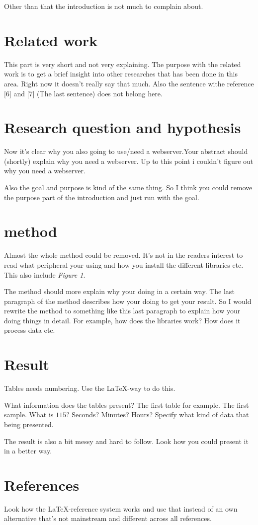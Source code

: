 \documentclass[12pt]{article}
\begin{document}
\bigskip

Other than that the introduction is not much to complain about.

\section{Related work} \label{}
This part is very short and not very explaining. The purpose with the related work is to get a brief insight into other researches that has been done in this area. Right now it doesn't really say that much. Also the sentence withe reference [6] and [7] (The last sentence) does not belong here.

\section{Research question and hypothesis} \label{}
Now it's clear why you also going to use/need a webserver.Your abstract should (shortly) explain why you need a webserver. Up to this point i couldn't figure out why you need a webserver.

Also the goal and purpose is kind of the same thing. So I think you could remove the purpose part of the introduction and just run with the goal.

\section{method} \label{}
Almost the whole method could be removed. It's not in the readers interest to read what peripheral your using and how you install the different libraries etc. This also include \textit{Figure 1}.

\bigskip

The method should more explain why your doing in a certain way. The last paragraph of the method describes how your doing to get your result. So I would rewrite the method to something like this last paragraph to explain how your doing things in detail. For example, how does the libraries work? How does it process data etc.

\section{Result} \label{}
Tables needs numbering. Use the \LaTeX-way to do this.

\bigskip

What information does the tables present? The first table for example. The first sample. What is $115$? Seconds? Minutes? Hours? Specify what kind of data that being presented.

\bigskip

The result is also a bit messy and hard to follow. Look how you could present it in a better way.

\section{References} \label{}
Look how the \LaTeX-reference system works and use that instead of an own alternative that's not mainstream and different across all references.
\end{document}
